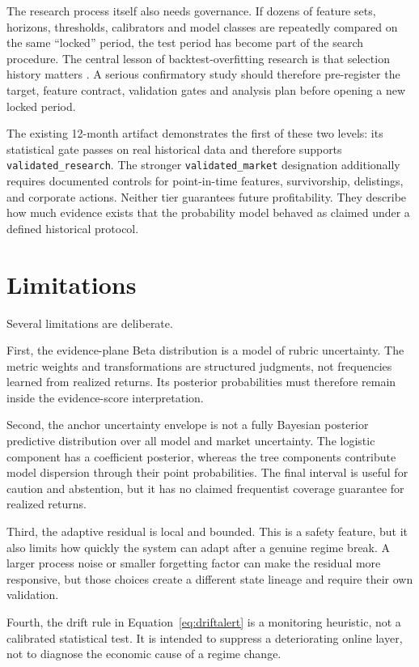 \documentclass[11pt]{article}
\begin{document}
The research process itself also needs governance. If dozens of feature sets, horizons, thresholds, calibrators and model classes are repeatedly compared on the same ``locked'' period, the test period has become part of the search procedure. The central lesson of backtest-overfitting research is that selection history matters \citep{bailey2017pbo}. A serious confirmatory study should therefore pre-register the target, feature contract, validation gates and analysis plan before opening a new locked period.

The existing 12-month artifact demonstrates the first of these two levels: its statistical gate passes on real historical data and therefore supports \texttt{validated\_research}. The stronger \texttt{validated\_market} designation additionally requires documented controls for point-in-time features, survivorship, delistings, and corporate actions. Neither tier guarantees future profitability. They describe how much evidence exists that the probability model behaved as claimed under a defined historical protocol.

\section{Limitations}
\label{sec:limitations}

Several limitations are deliberate.

First, the evidence-plane Beta distribution is a model of rubric uncertainty. The metric weights and transformations are structured judgments, not frequencies learned from realized returns. Its posterior probabilities must therefore remain inside the evidence-score interpretation.

Second, the anchor uncertainty envelope is not a fully Bayesian posterior predictive distribution over all model and market uncertainty. The logistic component has a coefficient posterior, whereas the tree components contribute model dispersion through their point probabilities. The final interval is useful for caution and abstention, but it has no claimed frequentist coverage guarantee for realized returns.

Third, the adaptive residual is local and bounded. This is a safety feature, but it also limits how quickly the system can adapt after a genuine regime break. A larger process noise or smaller forgetting factor can make the residual more responsive, but those choices create a different state lineage and require their own validation.

Fourth, the drift rule in Equation~\eqref{eq:driftalert} is a monitoring heuristic, not a calibrated statistical test. It is intended to suppress a deteriorating online layer, not to diagnose the economic cause of a regime change.
\end{document}
